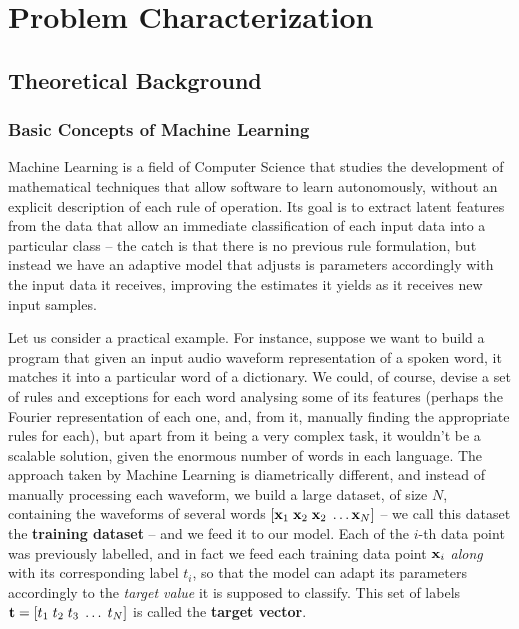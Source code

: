 \chapter{Problem Characterization}\label{chap:theorBack}

\section{Theoretical Background}

\subsection{Basic Concepts of Machine Learning}
Machine Learning is a field of Computer Science that studies the development of mathematical techniques that allow software to learn autonomously, without an explicit description of each rule of operation. Its goal is to extract latent features from the data that allow an immediate classification of each input data into a particular class -- the catch is that there is no previous rule formulation, but instead we have an adaptive model that adjusts is parameters accordingly with the input data it receives, improving the estimates it yields as it receives new input samples. 

Let us consider a practical example. For instance, suppose we want to build a program that given an input audio waveform representation of a spoken word, it matches it into a particular word of a dictionary. We could, of course, devise a set of rules and exceptions for each word analysing some of its features (perhaps the Fourier representation of each one, and, from it, manually finding the appropriate rules for each), but apart from it being a very complex task, it wouldn't be a scalable solution, given the enormous number of words in each language. The approach taken by Machine Learning is diametrically different, and instead of manually processing each waveform, we build a large dataset, of size $N$, containing the waveforms of several words $\left[ \mathbf{x}_1 \; \mathbf{x}_2 \;\mathbf{x}_2 \; \dots \mathbf{x}_N \right]$ -- we call this dataset the \textbf{training dataset} -- and we feed it to our model. Each of the $i$-th data point was previously labelled, and in fact we feed each training data point $\mathbf{x}_i$ \emph{along} with its corresponding label $t_i$, so that the model can adapt its parameters accordingly to the \emph{target value} it is supposed to classify. This set of labels $\mathbf{t} = \left[ t_1 \; t_2 \; t_3 \; \dots \; t_N \right]$ is called the \textbf{target vector}. 


